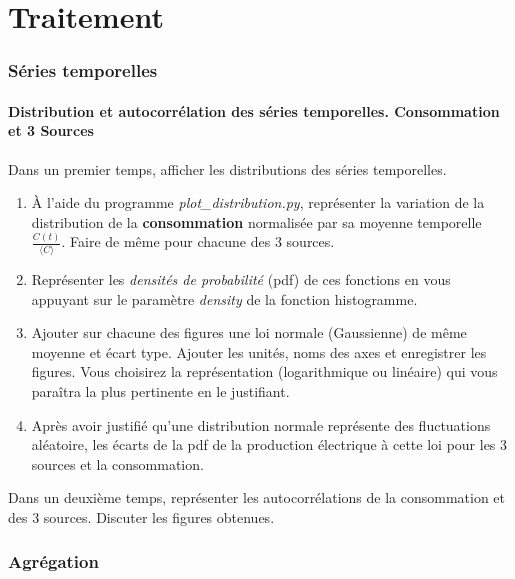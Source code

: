 \documentclass[12pt,a4,french]{article}
\newcommand{\tmtextbf}[1]{{\bfseries{#1}}}
\newcommand{\tmtextit}[1]{{\itshape{#1}}}
\begin{document}
\newpage
\part{Traitement}

\section{Séries temporelles}



\subsection{Distribution et autocorrélation des séries temporelles. Consommation et 3 Sources}
Dans un premier temps, afficher les distributions des séries temporelles.
\begin{enumerate}
  \item À l'aide du programme \tmtextit{plot\_distribution.py}, représenter
  la variation de la distribution de la \tmtextbf{consommation} normalisée
  par sa moyenne temporelle $\frac{C (t)}{\langle C \rangle}$. Faire de même pour chacune des 3 sources.
  \item  Représenter les \tmtextit{densités de probabilité}
  (pdf) de ces fonctions en vous appuyant sur le paramètre \tmtextit{density}
  de la fonction histogramme. 
  \item Ajouter sur chacune des figures une loi normale (Gaussienne) de même moyenne et écart type. Ajouter les unités,  noms des axes et enregistrer les figures. Vous choisirez la représentation (logarithmique ou linéaire) qui vous paraîtra la plus pertinente en le justifiant.
  \item Après avoir justifié qu'une distribution normale représente des
  fluctuations aléatoire, les écarts de la pdf de la production électrique à cette loi pour les 3 sources et la consommation.
\end{enumerate}

Dans un deuxième temps, représenter les autocorrélations de la consommation  et des 3 sources. Discuter les figures obtenues.

\section{Agrégation}
\end{document}
